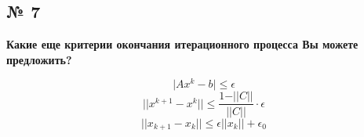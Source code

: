 \documentclass[a4paper, 14pt]{article}
\begin{document}
\subsection*{№ 7}
\textbf{Какие еще критерии окончания итерационного процесса Вы можете предложить? \\}

\begin{equation*}
    \vert Ax^k - b \vert \leq \epsilon
\end{equation*}
\begin{equation*}
\vert \vert x^{k+1} - x^{k} \vert \vert \leq \frac{1 - \vert \vert C \vert \vert }{\vert \vert C \vert \vert} \cdot \epsilon
\end{equation*}
\begin{equation*}
\vert \vert x_{k+1} - x_{k} \vert \vert \leq \epsilon \vert \vert x_k \vert \vert + \epsilon_{0}
\end{equation*}
\end{document}

